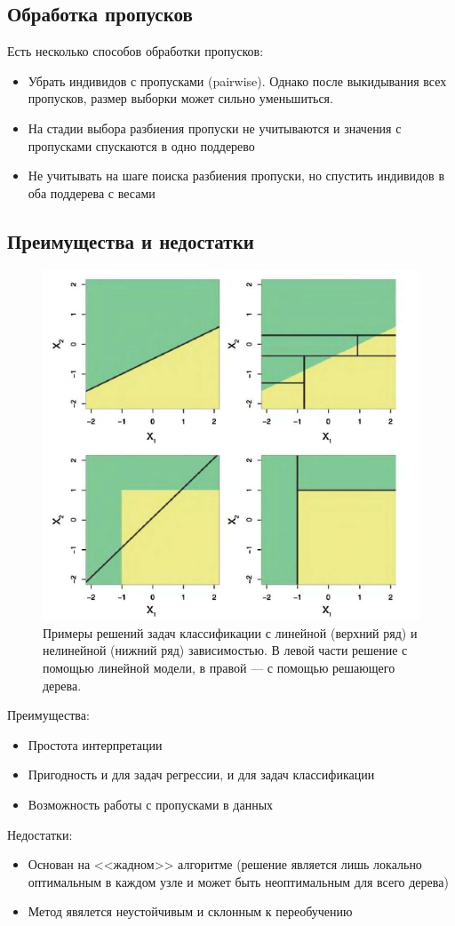 \documentclass{article}
\theoremstyle{definition}
\theoremstyle{theorem}
\theoremstyle{remark}
\theoremstyle{theorem}
\theoremstyle{example}
\theoremstyle{theorem}
\theoremstyle{theorem}
\theoremstyle{theorem}
\theoremstyle{theorem}
\begin{document}
	\subsection{Обработка пропусков}
		Есть несколько способов обработки пропусков:
		\begin{itemize}
			\item Убрать индивидов с пропусками (pairwise). Однако после выкидывания всех пропусков, размер выборки может сильно уменьшиться.
			\item На стадии выбора разбиения пропуски не учитываются и значения с пропусками спускаются в одно поддерево
			\item Не учитывать на шаге поиска разбиения пропуски, но спустить индивидов в оба поддерева с весами
		\end{itemize}
	\newpage
	\subsection{ Преимущества и недостатки}
		\begin{figure}[h!]
			\includegraphics[width=\textwidth]{linreg_vs_tree}\caption{Примеры решений задач классификации с линейной (верхний ряд) и нелинейной (нижний ряд) зависимостью. В левой части решение с помощью линейной модели, в правой --- с помощью  решающего дерева.}
		\end{figure}
		Преимущества:
\begin{itemize}
\item  Простота интерпретации
\item  Пригодность и для задач регрессии, и для задач классификации
\item  Возможность работы с пропусками в данных
\end{itemize}
Недостатки:
\begin{itemize}
\item Основан на <<жадном>> алгоритме (решение является лишь локально оптимальным в каждом узле и может быть неоптимальным для всего дерева)
\item Метод явялется неустойчивым и склонным к переобучению
\end{itemize}
\end{document}
